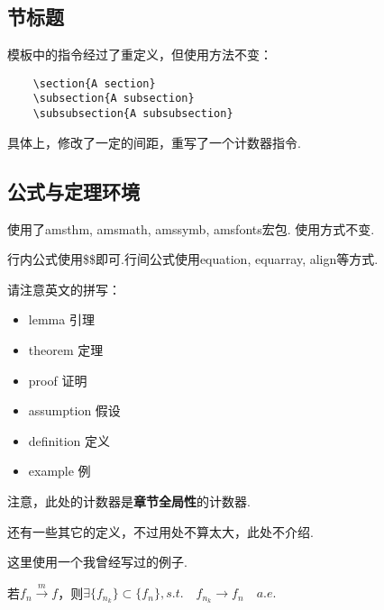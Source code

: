 \documentclass[bwprint, withouttitlepage]{mathexpthesis}
\begin{document}
\subsection{节标题}
模板中的指令经过了重定义，但使用方法不变：
\begin{verbatim}
    \section{A section}
    \subsection{A subsection}
    \subsubsection{A subsubsection}
\end{verbatim}

具体上，修改了一定的间距，重写了一个计数器指令.

\subsection{公式与定理环境}
使用了amsthm, amsmath, amssymb, amsfonts宏包. 使用方式不变.

行内公式使用\$\$即可.行间公式使用equation, equarray, align等方式.

请注意英文的拼写：
\begin{itemize}[itemindent=2em]
    \item lemma 引理
    \item theorem 定理
    \item proof 证明
    \item assumption 假设
    \item definition 定义
    \item example 例
\end{itemize}

注意，此处的计数器是\textbf{章节全局性}的计数器.

还有一些其它的定义，不过用处不算太大，此处不介绍.

这里使用一个我曾经写过的例子.

\begin{theorem}[Risez定理]
    若$f_n \stackrel{m}{\longrightarrow} f$，则$\exists \{f_{n_k}\} \subset \{f_n\}, s.t. \quad f_{n_k} \to f_n \quad a.e.$
\end{theorem}
\end{document}
